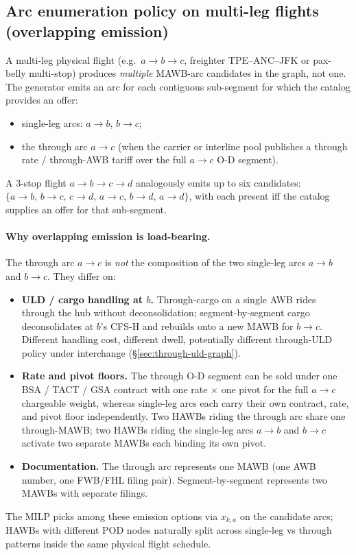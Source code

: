 \documentclass[11pt,a4paper]{article}
\theoremstyle{definition}
\begin{document}
\subsection{Arc enumeration policy on multi-leg flights (overlapping emission)}
\label{sec:arc-enumeration}

A multi-leg physical flight (e.g.\ $a \to b \to c$, freighter
TPE--ANC--JFK or pax-belly multi-stop) produces \emph{multiple} MAWB-arc
candidates in the graph, not one. The generator emits an arc for each
contiguous sub-segment for which the catalog provides an offer:
\begin{itemize}[noitemsep]
  \item single-leg arcs: $a \to b$, $b \to c$;
  \item the through arc $a \to c$ (when the carrier or interline pool
        publishes a through rate / through-AWB tariff over the full
        $a \to c$ O-D segment).
\end{itemize}
A 3-stop flight $a \to b \to c \to d$ analogously emits up to six
candidates: $\{a\!\to\!b,\, b\!\to\!c,\, c\!\to\!d,\, a\!\to\!c,\,
b\!\to\!d,\, a\!\to\!d\}$, with each present iff the catalog supplies an
offer for that sub-segment.

\paragraph{Why overlapping emission is load-bearing.}
The through arc $a \to c$ is \emph{not} the composition of the two
single-leg arcs $a \to b$ and $b \to c$. They differ on:
\begin{itemize}[noitemsep]
  \item \textbf{ULD / cargo handling at $b$.} Through-cargo on a single AWB
        rides through the hub without deconsolidation; segment-by-segment
        cargo deconsolidates at $b$'s CFS-H and rebuilds onto a new MAWB
        for $b \to c$. Different handling cost, different dwell, potentially
        different through-ULD policy under interchange
        (\S\ref{sec:through-uld-graph}).
  \item \textbf{Rate and pivot floors.} The through O-D segment can be sold
        under one BSA / TACT / GSA contract with one rate $\times$ one
        pivot for the full $a \to c$ chargeable weight, whereas
        single-leg arcs each carry their own contract, rate, and pivot
        floor independently. Two HAWBs riding the through arc share one
        through-MAWB; two HAWBs riding the single-leg arcs $a \to b$ and
        $b \to c$ activate two separate MAWBs each binding its own pivot.
  \item \textbf{Documentation.} The through arc represents one MAWB
        (one AWB number, one FWB/FHL filing pair). Segment-by-segment
        represents two MAWBs with separate filings.
\end{itemize}
The MILP picks among these emission options via $x_{k, a}$ on the candidate
arcs; HAWBs with different POD nodes naturally split across single-leg vs
through patterns inside the same physical flight schedule.
\end{document}
